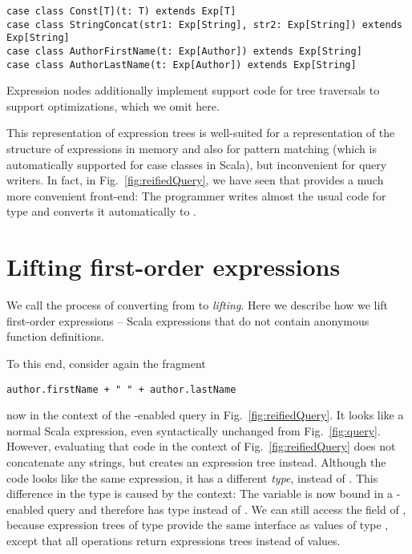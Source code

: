 \begin{lstlisting}
case class Const[T](t: T) extends Exp[T]
case class StringConcat(str1: Exp[String], str2: Exp[String]) extends Exp[String]
case class AuthorFirstName(t: Exp[Author]) extends Exp[String]
case class AuthorLastName(t: Exp[Author]) extends Exp[String]
\end{lstlisting}

Expression nodes additionally implement support code for tree traversals to support optimizations, which we omit here.

This representation of expression trees is well-suited for a representation of the structure of expressions in memory and also for pattern matching (which is automatically supported for case classes in Scala), but inconvenient for query writers. In fact, in Fig.~\ref{fig:reifiedQuery}, we have seen that {\LoS} provides a much more convenient front-end: The programmer writes almost the usual code for type  and {\LoS} converts it automatically to .

\section{Lifting first-order expressions}

We call the process of converting from  to  \emph{lifting}. Here we describe how we lift first-order expressions -- Scala expressions that do
not contain anonymous function definitions.

To this end, consider again the fragment
\begin{lstlisting}
author.firstName + " " + author.lastName
\end{lstlisting}
now in the context of the {\LoS}-enabled query in Fig.~\ref{fig:reifiedQuery}. It looks like a normal Scala expression, even syntactically unchanged from Fig.~\ref{fig:query}. However, evaluating that code in the context of Fig.~\ref{fig:reifiedQuery} does not concatenate any strings, but creates an expression tree instead. Although the code looks like the same expression, it has a different \emph{type},  instead of . This difference in the type is caused by the context: The variable  is now bound in a {\LoS}-enabled query and therefore has type  instead of . We can still access the  field of , because expression trees of type  provide the same interface as values of type , except that all operations return expressions trees instead of values.

